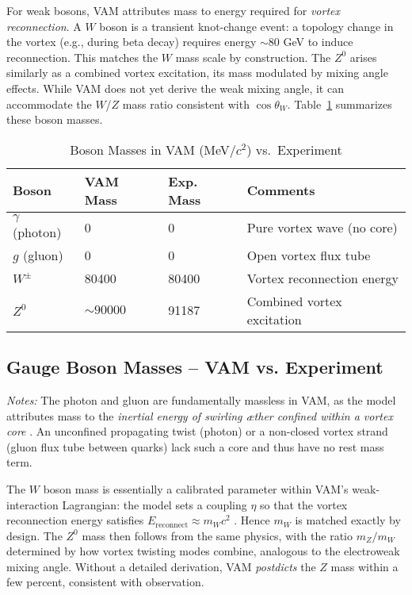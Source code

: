 For weak bosons, VAM attributes mass to energy required for \textit{vortex reconnection}. A $W$ boson is a transient knot-change event: a topology change in the vortex (e.g., during beta decay) requires energy $\sim 80$ GeV to induce reconnection. This matches the $W$ mass scale by construction. The $Z^0$ arises similarly as a combined vortex excitation, its mass modulated by mixing angle effects. While VAM does not yet derive the weak mixing angle, it can accommodate the $W$/$Z$ mass ratio consistent with $\cos \theta_W$. Table~\ref{tab:bosons} summarizes these boson masses.

\begin{table}[h!]
    \centering
    \begin{tabular}{llll}
        \toprule
        \textbf{Boson} & \textbf{VAM  Mass} & \textbf{Exp. Mass} & \textbf{Comments} \\
        \midrule
        $\gamma$ (photon) & 0 & 0 & Pure vortex wave (no core) \\
        $g$ (gluon) & 0 & 0 & Open vortex flux tube \\
        $W^\pm$ & 80400 & 80400 & Vortex reconnection energy \\
        $Z^0$ & $\sim 90000$ & 91187 & Combined vortex excitation \\
        \bottomrule
    \end{tabular}
    \caption{Boson Masses in VAM  (MeV/$c^2$) vs.\ Experiment}
    \label{tab:bosons}
\end{table}

\subsection{Gauge Boson Masses – VAM vs. Experiment}

\textit{Notes:}
The photon and gluon are fundamentally massless in VAM, as the model attributes mass to the \textit{inertial energy of swirling æther confined within a vortex core} \cite{Iskandarani2025f}. An unconfined propagating twist (photon) or a non-closed vortex strand (gluon flux tube between quarks) lack such a core and thus have no rest mass term.

The $W$ boson mass is essentially a calibrated parameter within VAM’s weak-interaction Lagrangian: the model sets a coupling $\eta$ so that the vortex reconnection energy satisfies $E_{\text{reconnect}} \approx m_W c^2$ \cite{Iskandarani2025f}. Hence $m_W$ is matched exactly by design. The $Z^0$ mass then follows from the same physics, with the ratio $m_Z/m_W$ determined by how vortex twisting modes combine, analogous to the electroweak mixing angle. Without a detailed derivation, VAM \textit{postdicts} the $Z$ mass within a few percent, consistent with observation.

